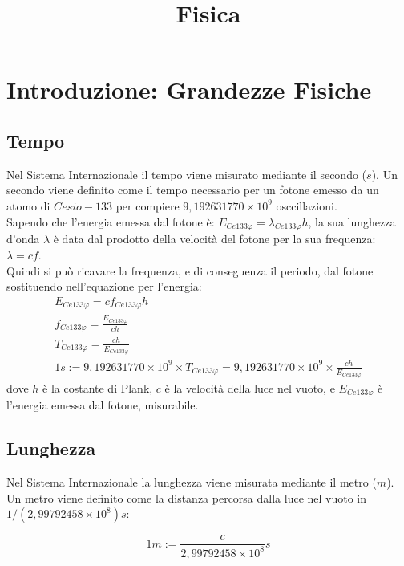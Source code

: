 \documentclass{article}
\title{Fisica}
\author{}
\date{}
\numberwithin{equation}{subsection}
\begin{document}
\maketitle

\clearpage

\tableofcontents

\clearpage

\section{Introduzione: Grandezze Fisiche}
\subsection{Tempo}

Nel Sistema Internazionale il tempo viene misurato mediante 
il secondo ($s$).
Un secondo viene definito come il tempo necessario per un 
fotone emesso da un atomo di $Cesio-133$ per compiere 
$9{,}192631770\times 10^9$ osccillazioni.\\
Sapendo che l'energia emessa dal fotone è: 
$E_{Ce133\varphi} = \lambda_{Ce133\varphi}h$, la sua lunghezza 
d'onda $\lambda$ è data dal prodotto della velocità del fotone 
per la sua frequenza: $\lambda  = cf$.\\
Quindi si può ricavare la frequenza, e di conseguenza il 
periodo, dal fotone sostituendo nell'equazione per l'energia: 
\begin{gather}
    E_{Ce133\varphi} = cf_{Ce133\varphi}h\\
    f_{Ce133\varphi} = \displaystyle\frac{E_{Ce133\varphi}}{ch}\\
    T_{Ce133\varphi} = \displaystyle\frac{ch}{E_{Ce133\varphi}}\\
    1s := 9{,}192631770\times 10^9 \times T_{Ce133\varphi} = 9{,}192631770\times 10^9 \times \displaystyle\frac{ch}{E_{Ce133\varphi}}
\end{gather}
dove $h$ è la costante di Plank, $c$ è la velocità della luce nel vuoto, e $E_{Ce133\varphi}$ è l'energia emessa dal fotone, misurabile.

\subsection{Lunghezza}
Nel Sistema Internazionale la lunghezza viene misurata 
mediante il metro ($m$). Un metro viene definito come la 
distanza percorsa dalla luce nel vuoto in 
$1/(2{,}99792458\times 10^8)s$:

\begin{equation}
    1m := \displaystyle\frac{c}{2{,}99792458\times 10^8}s
\end{equation}
\end{document}
